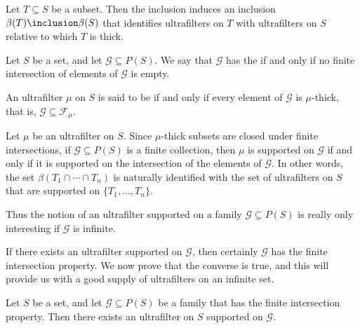 \begin{eg}
	Let $ T \subseteq S $ be a subset.
	Then the inclusion induces an inclusion
	$ \beta(T) \inclusion \beta(S) $
	that identifies ultrafilters on $ T $ with
	ultrafilters on $ S $ relative to which
	$ T $ is thick.
\end{eg}

\begin{definition}
	Let $ S $ be a set, and let $ \mathscr{G} \subseteq P(S) $.
	We say that $ \mathscr{G} $ has the
	 if and only if
	no finite intersection of elements of $ \mathscr{G} $
	is empty.

	An ultrafilter $ \mu $ on $ S $ is said to be
	 if and only if
	every element of $ \mathscr{G} $ is $ \mu $-thick,
	that is, $ \mathscr{G} \subseteq \mathscr{F}_{\mu} $.
\end{definition}

\begin{eg}
	Let $ \mu $ be an ultrafilter on $ S $.
	Since $ \mu $-thick subsets are closed under
	finite intersections,
	if $ \mathscr{G} \subseteq P(S) $ is a finite collection,
	then $ \mu $ is supported on $ \mathscr{G} $
	if and only if it is supported on
	the intersection of the elements of $ \mathscr{G} $.
	In other words, the set
	$ \beta(T_1 \cap \cdots \cap T_n) $ is naturally identified with
	the set of ultrafilters on $ S $ that are 
	supported on $ \{T_1, \ldots, T_n\} $.

	Thus the notion of an ultrafilter supported
	on a family $ \mathscr{G} \subseteq P(S) $
	is really only interesting if $ \mathscr{G} $ is infinite.
\end{eg}

If there exists an ultrafilter supported on $ \mathscr{G} $,
then certainly $ \mathscr{G} $ has the finite intersection property.
We now prove that the converse is true, and 
this will provide us with a good supply of ultrafilters
on an infinite set.

\begin{lemma}%
	\label{lem:generateultrafilters}
	Let $ S $ be a set, and let $ \mathscr{G} \subseteq P(S) $
	be a family that has the finite intersection property.
	Then there exists an ultrafilter on $ S $
	supported on $ \mathscr{G} $.
\end{lemma}

